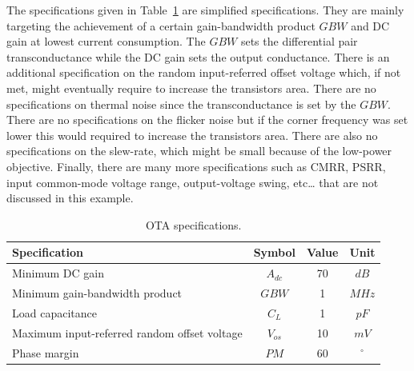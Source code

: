 \documentclass[
  a4paper,
  DIV=11,
  numbers=noendperiod]{scrreprt}
\begin{document}
\begin{tcolorbox}[enhanced jigsaw, bottomrule=.15mm, colback=white, leftrule=.75mm, toprule=.15mm, opacitybacktitle=0.6, colbacktitle=quarto-callout-note-color!10!white, left=2mm, colframe=quarto-callout-note-color-frame, coltitle=black, bottomtitle=1mm, arc=.35mm, toptitle=1mm, titlerule=0mm, title=\textcolor{quarto-callout-note-color}{\faInfo}\hspace{0.5em}{Note}, breakable, opacityback=0, rightrule=.15mm]

The specifications given in Table~\ref{tbl-ota_specs} are simplified
specifications. They are mainly targeting the achievement of a certain
gain-bandwidth product \(GBW\) and DC gain at lowest current
consumption. The \(GBW\) sets the differential pair transconductance
while the DC gain sets the output conductance. There is an additional
specification on the random input-referred offset voltage which, if not
met, might eventually require to increase the transistors area. There
are no specifications on thermal noise since the transconductance is set
by the \(GBW\). There are no specifications on the flicker noise but if
the corner frequency was set lower this would required to increase the
transistors area. There are also no specifications on the slew-rate,
which might be small because of the low-power objective. Finally, there
are many more specifications such as CMRR, PSRR, input common-mode
voltage range, output-voltage swing, etc\ldots{} that are not discussed
in this example.

\end{tcolorbox}

\begin{longtable}[]{@{}lccc@{}}

\caption{\label{tbl-ota_specs}OTA specifications.}

\tabularnewline

\toprule\noalign{}
Specification & Symbol & Value & Unit \\
\midrule\noalign{}
\endhead
\bottomrule\noalign{}
\endlastfoot
Minimum DC gain & \(A_{{dc}}\) & 70 & \(dB\) \\
Minimum gain-bandwidth product & \(GBW\) & 1 & \(MHz\) \\
Load capacitance & \(C_L\) & 1 & \(pF\) \\
Maximum input-referred random offset voltage & \(V_{{os}}\) & 10 &
\(mV\) \\
Phase margin & \(PM\) & 60 & \(^{\circ}\) \\

\end{longtable}
\end{document}
